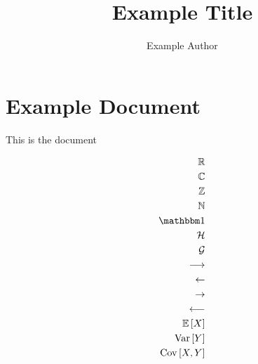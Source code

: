 \documentclass{unswmaths}
\begin{document}
\subject{Example Subject}
\author{Example Author}
\title{Example Title}
%
%
%

\setlength\parindent{0pt}
\unswtitle

\section*{Example Document}
This is the document

\begin{align*}
	\Rl \\
	\Cplx \\
	\Itgr \\
	\Ntrl \\
	\Ind \\
	\Hlbt \\
	\Grp \\
	\lra \\
	\la \\
	\ra \\
	\lla \\
	\E{X} \\
	\Var{Y} \\
	\Cov{X}{Y} \\
\end{align*}
\end{document}
